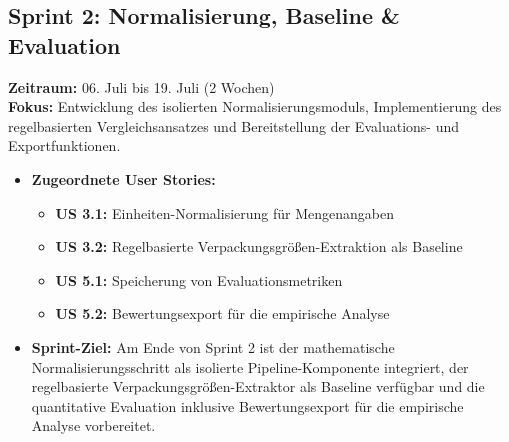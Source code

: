 \documentclass[11pt,a4paper]{article}
\begin{document}
\subsection{Sprint 2: Normalisierung, Baseline \& Evaluation}

\textbf{Zeitraum:} 06. Juli bis 19. Juli (2 Wochen) \\
\textbf{Fokus:} Entwicklung des isolierten Normalisierungsmoduls, Implementierung des regelbasierten Vergleichsansatzes und Bereitstellung der Evaluations- und Exportfunktionen.

\begin{itemize}
    \item \textbf{Zugeordnete User Stories:}
    \begin{itemize}[label=$\diamond$]
        \item \textbf{US 3.1:} Einheiten-Normalisierung für Mengenangaben
        \item \textbf{US 3.2:} Regelbasierte Verpackungsgrößen-Extraktion als Baseline
        \item \textbf{US 5.1:} Speicherung von Evaluationsmetriken
        \item \textbf{US 5.2:} Bewertungsexport für die empirische Analyse
    \end{itemize}
    
    \item \textbf{Sprint-Ziel:} Am Ende von Sprint 2 ist der mathematische Normalisierungsschritt als isolierte Pipeline-Komponente integriert, der regelbasierte Verpackungsgrößen-Extraktor als Baseline verfügbar und die quantitative Evaluation inklusive Bewertungsexport für die empirische Analyse vorbereitet.
\end{itemize}
\end{document}
